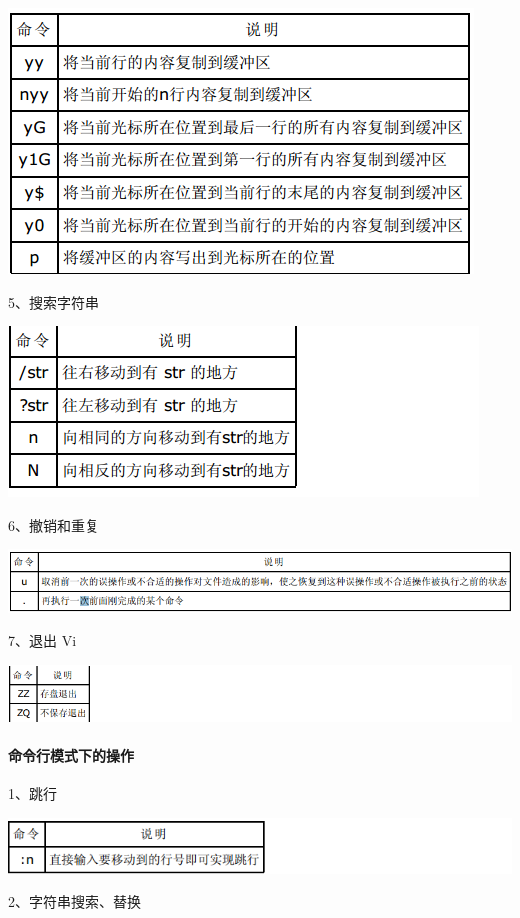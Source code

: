 \documentclass[letterpaper,10pt]{sphinxmanual}
\begin{document}
\includegraphics{copy.png}

5、搜索字符串

\includegraphics{search.png}

6、撤销和重复

\includegraphics{repeat.png}

7、退出 Vi

\includegraphics{exit.png}


\paragraph{命令行模式下的操作}
\label{Linux_vim/command:id4}
1、跳行

\includegraphics{jump.png}

2、字符串搜索、替换
\end{document}
